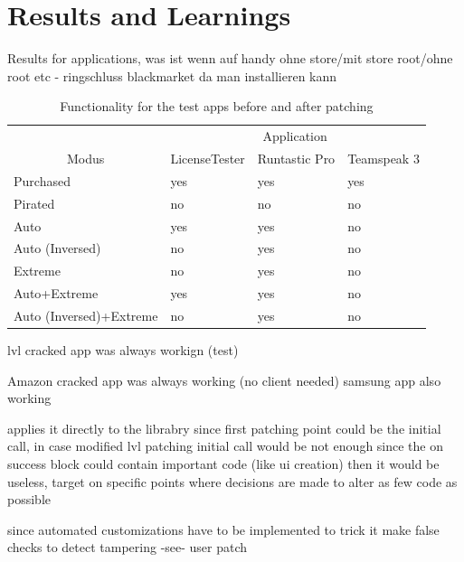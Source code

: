 \section{Results and Learnings} \label{section:luckypatcher-learnings}


Results for applications, was ist wenn auf handy ohne store/mit store root/ohne root etc - ringschluss blackmarket da man installieren kann


\begin{table}[h]
\centering
\begin{tabular}{llll}
                                             & \multicolumn{3}{c}{Application}             \\
\multicolumn{1}{c|}{Modus}                   & LicenseTester & Runtastic Pro & Teamspeak 3 \\ \hline
\multicolumn{1}{l|}{Purchased}               & yes           & yes           & yes         \\
\multicolumn{1}{l|}{Pirated}                 & no            & no            & no          \\
\multicolumn{1}{l|}{Auto}                    & yes           & yes           & no          \\
\multicolumn{1}{l|}{Auto (Inversed)}         & no            & yes           & no          \\
\multicolumn{1}{l|}{Extreme}                 & no            & yes           & no          \\
\multicolumn{1}{l|}{Auto+Extreme}            & yes           & yes           & no          \\
\multicolumn{1}{l|}{Auto (Inversed)+Extreme} & no            & yes           & no
\end{tabular}
\caption{Functionality for the test apps before and after patching}
\label{table:functionality}
\end{table}

lvl cracked app was always workign (test)

Amazon cracked app was always working (no client needed)
samsung app also working

applies it directly to the librabry since first patching point could be the initial call, in case modified lvl patching initial call would be not enough since the on success block could contain important code (like ui creation) then it would be useless, target on specific points where decisions are made to alter as few code as possible

since automated customizations have to be implemented to trick it
make false checks to detect tampering -see- user patch

